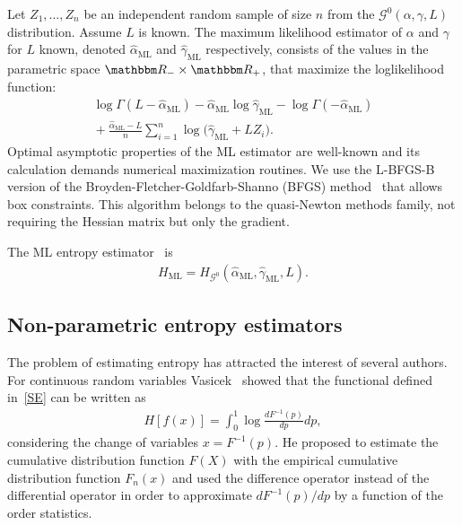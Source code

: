\documentclass[journal]{IEEEtran}
\begin{document}
Let $Z_1,\dots, Z_n$ be an independent random sample of size $n$ from the $\mathcal G^0(\alpha,\gamma,L)$ distribution.
Assume $L$ is known.
The maximum likelihood estimator of $\alpha$ and $\gamma$ for $L$ known, denoted $\widehat\alpha_{\text{ML}}$ and $\widehat\gamma_{\text{ML}}$ respectively, consists of the values in the parametric space $\mathbbm R_-\times\mathbbm R_+$, that maximize the loglikelihood function:
\begin{multline}
	\log \Gamma(L-\widehat\alpha_{\text{ML}})-
	\widehat\alpha_{\text{ML}}\log \widehat\gamma_{\text{ML}} -\log\Gamma(-\widehat\alpha_{\text{ML}})  \\
	\mbox{}+\frac{\widehat\alpha_{\text{ML}}-L}{n} \sum_{i=1}^n\log\big(\widehat\gamma_{\text{ML}}+L Z_i\big).
	\label{ML}
\end{multline}
Optimal asymptotic properties of the ML estimator are well-known and its calculation demands numerical maximization routines.
We use the L-BFGS-B version of the Broyden-Fletcher-Goldfarb-Shanno (BFGS) method~\cite{Luenberger2008} that allows box constraints.
This algorithm belongs to the quasi-Newton methods family, not requiring the Hessian matrix but only the gradient.

The ML entropy estimator~\cite{CaseBerg01} is
\begin{align}
	H_\text{ML}=H_{\mathcal G^0}(\widehat{\alpha}_{\text{ML}},\widehat{\gamma}_{\text{ML}},L).
\end{align}




\subsection{Non-parametric entropy estimators}
\label{Hest}

The problem of estimating entropy has attracted the interest of several authors. For continuous random variables Vasicek~\cite{Vasicek76} showed that the functional defined in~\eqref{SE} can be written as
\begin{align}
	H[f(x)]=\int_{0}^{1} \log \frac{d F^{-1}(p)}{d p} d p,
\end{align}
considering the change of variables $x=F^{-1}(p).$
He proposed to estimate the cumulative distribution function  $F(X)$ with the empirical cumulative distribution function $F_n(x)$ and used the difference operator instead of the differential operator in order to approximate ${d F^{-1}(p)}/{d p}$ by a function of the order statistics.
\end{document}
